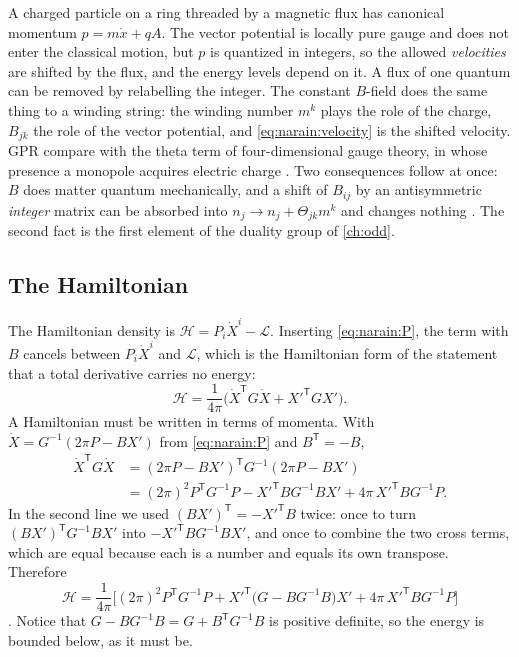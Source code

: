 \begin{physicsbox}
A charged particle on a ring threaded by a magnetic flux has canonical momentum
$p=m\dot x+qA$. The vector potential is locally pure gauge and does not enter the classical
motion, but $p$ is quantized in integers, so the allowed \emph{velocities} are shifted by the
flux, and the energy levels depend on it. A flux of one quantum can be removed by relabelling
the integer. The constant $B$-field does the same thing to a winding string: the winding
number $m^k$ plays the role of the charge, $B_{jk}$ the role of the vector potential, and
\eqref{eq:narain:velocity} is the shifted velocity. GPR compare with the theta term of
four-dimensional gauge theory, in whose presence a monopole acquires electric charge
. Two consequences follow at once: $B$ does
matter quantum mechanically, and a shift of $B_{ij}$ by an antisymmetric \emph{integer}
matrix can be absorbed into $n_j\to n_j+\Theta_{jk}m^k$ and changes nothing
. The second fact is the first element of the duality group of
\cref{ch:odd}.
\end{physicsbox}

\subsection{The Hamiltonian}

The Hamiltonian density is $\mathcal H=P_i\dot X^i-\mathcal L$. Inserting
\eqref{eq:narain:P}, the term with $B$ cancels between $P_i\dot X^i$ and $\mathcal L$, which is
the Hamiltonian form of the statement that a total derivative carries no energy:
\begin{equation}\label{eq:narain:Hvel}
 \mathcal H=\frac1{4\pi}\Big(\dot X^{\mathsf T}G\dot X+X'^{\mathsf T}GX'\Big).
\end{equation}
A Hamiltonian must be written in terms of momenta. With $\dot X=G^{-1}(2\pi P-BX')$ from
\eqref{eq:narain:P} and $B^{\mathsf T}=-B$,
\begin{align}
 \dot X^{\mathsf T}G\dot X
 &=(2\pi P-BX')^{\mathsf T}G^{-1}(2\pi P-BX')\nonumber\\
 &=(2\pi)^2P^{\mathsf T}G^{-1}P-X'^{\mathsf T}BG^{-1}BX'+4\pi\,X'^{\mathsf T}BG^{-1}P .
\end{align}
In the second line we used $(BX')^{\mathsf T}=-X'^{\mathsf T}B$ twice: once to turn
$(BX')^{\mathsf T}G^{-1}BX'$ into $-X'^{\mathsf T}BG^{-1}BX'$, and once to combine the two cross
terms, which are equal because each is a number and equals its own transpose. Therefore
\begin{equation}\label{eq:narain:Hdensity}
 \mathcal H=\frac1{4\pi}\Big[(2\pi)^2P^{\mathsf T}G^{-1}P
 +X'^{\mathsf T}\big(G-BG^{-1}B\big)X'+4\pi\,X'^{\mathsf T}BG^{-1}P\Big]
\end{equation}
. Notice that $G-BG^{-1}B=G+B^{\mathsf T}G^{-1}B$ is
positive definite, so the energy is bounded below, as it must be.

